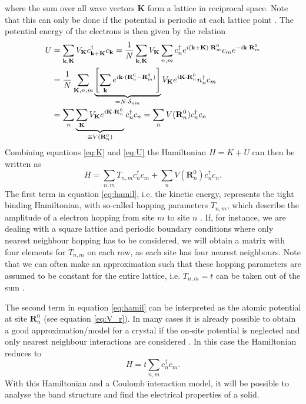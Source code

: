 where the sum over all wave vectors $\mathbf{K}$ form a lattice in reciprocal space. Note that this can only be done if the potential is periodic at each lattice point \cite{Quinn2018}. The potential energy of the electrons is then given by the relation \cite{Quinn2018}
\begin{equation}\label{eq:U}
\begin{split}
    U &= \sum_{\mathbf{k},\mathbf{K}}V_\mathbf{K}c_{\mathbf{k}+\mathbf{K}}^\dagger c_\mathbf{k} = \frac{1}{N} \sum_{\mathbf{k},\mathbf{K}}V_\mathbf{K} \sum_{n,m}c_n^\dagger e^{i(\mathbf{k}+\mathbf{K})\cdot\mathbf{R}_m^0}c_me^{-i\mathbf{k}\cdot\mathbf{R}_m^0}\\
    &= \frac{1}{N}\sum_{\mathbf{K},n,m}\underbrace{\left[\sum_\mathbf{k}e^{i\mathbf{k}\cdot(\mathbf{R}_n^0-\mathbf{R}_m^0)}\right]}_{=N\cdot \delta_{nm}}V_\mathbf{K}e^{i\mathbf{K}\cdot\mathbf{R}_n^0}n_n^\dagger c_m\\
    &=\sum_n\underbrace{\sum_{\mathbf{K}}V_\mathbf{K}e^{i\mathbf{K}\cdot\mathbf{R}_n^0}}_{\equiv V(\mathbf{R}_n^0)}c_n^\dagger c_n = \sum_n V(\mathbf{R}_n^0) c_n^\dagger c_n
\end{split}
\end{equation}
Combining equations \ref{eq:K} and \ref{eq:U} the Hamiltonian $H=K+U$ can then be written as \cite{Quinn2018}
\begin{equation}\label{eq:hamil}
    H = \sum_{n,m}T_{n,m} c_n^\dagger c_m + \sum_n V(\mathbf{R}_n^0) c_n^\dagger c_n.
\end{equation}
The first term in equation \ref{eq:hamil}, i.e. the kinetic energy, represents the tight binding Hamiltonian, with so-called hopping parameters $T_{n,m}$, which describe the amplitude of a electron hopping from site $m$ to site $n$ \cite{Quinn2018}. If, for instance, we are dealing with a square lattice and periodic boundary conditions where only nearest neighbour hopping has to be considered, we will obtain a matrix with four elements for $T_{n,m}$ on each row, as each site has four nearest neighbours. Note that we can often make an approximation such that these hopping parameters are assumed to be constant for the entire lattice, i.e. $T_{n,m} = t$ can be taken out of the sum \cite{Czycholl2016}.

The second term in equation \ref{eq:hamil} can be interpreted as the atomic potential at site $\mathbf{R}_n^0$ (see equation \ref{eq:V_r}). In many cases it is already possible to obtain a good approximation/model for a crystal if the on-site potential is neglected and only nearest neighbour interactions are considered \cite{Czycholl2016}. In this case the Hamiltonian reduces to \cite{Westerhout2018}
\begin{equation}\label{eq:reduced_hamil}
    H = t\sum_{n,m}c_n^\dagger c_m.
\end{equation}
With this Hamiltonian and a Coulomb interaction model, it will be possible to analyse the band structure and find the electrical properties of a solid. 

